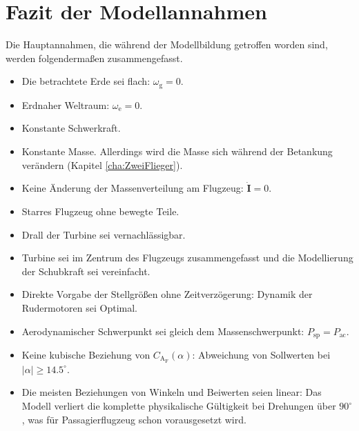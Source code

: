 \section{Fazit der Modellannahmen}
Die Hauptannahmen, die während der Modellbildung getroffen worden sind, werden folgenderma{\ss}en zusammengefasst.
\begin{itemize}
\item Die betrachtete Erde sei flach: $\omega_\mathrm{g} = 0$.
\item Erdnaher Weltraum: $\omega_\mathrm{e} = 0$.
\item Konstante Schwerkraft.
\item Konstante Masse. Allerdings wird die Masse sich während der Betankung verändern (Kapitel \ref{cha:ZweiFlieger}).
\item Keine Änderung der Massenverteilung am Flugzeug: $\dot{\textbf{I}} = 0$.
\item Starres Flugzeug ohne bewegte Teile.
\item Drall der Turbine sei vernachlässigbar.
\item Turbine sei im Zentrum des Flugzeugs zusammengefasst und die Modellierung der Schubkraft sei vereinfacht.
\item Direkte Vorgabe der Stellgrö{\ss}en ohne Zeitverzögerung: Dynamik der Rudermotoren sei Optimal.
\item Aerodynamischer Schwerpunkt sei gleich dem Massenschwerpunkt: $P_\mathrm{sp} = P_\mathrm{ac}$.
\item Keine kubische Beziehung von $C_\mathrm{A_F}(\alpha)$: Abweichung von Sollwerten bei $|\alpha|\geq 14.5^{\circ}$.
\item Die meisten Beziehungen von Winkeln und Beiwerten seien linear: Das Modell verliert die komplette physikalische Gültigkeit bei Drehungen über $90^{\circ}$, was für Passagierflugzeug schon vorausgesetzt wird.

\end{itemize}

